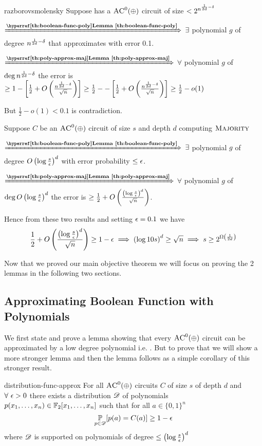 \begin{proof-of-theorem}{razborovsmolensky}
	Suppose  has a $\textsc{AC}^0(\oplus)$ circuit of size $<2^{n^{\frac1{2d}-\delta}}$\parinf
	
	$\xRightarrow{\textbf{\lmref{boolean-func-poly}}}$ $\exists$ polynomial $g$ of degree $n^{\frac1{2d}-\delta}$ that approximates  with error 0.1.
	
	
	$\xRightarrow{\textbf{\lmref{poly-approx-maj}}}$ $\forall$ polynomial $g$ of $\deg n^{\frac1{2d}-\delta}$ the error is $\geq 1-\left[\frac12+O\left( \frac{n^{\frac1{2d}-\delta}}{\sqrt{n}} \right)\right]\geq \frac12--\left[\frac12+O\left( \frac{n^{\frac1{2d}-\delta}}{\sqrt{n}} \right)\right]\geq  \frac12-o(1)$
	\parinn
	
	But $\frac12-o(1)<0.1$ is contradiction.
\end{proof-of-theorem}
\begin{alternate-proof}[razborovsmolensky]
	Suppose $C$ be an $\textsc{AC}^0(\oplus)$ circuit of size $s$ and depth $d$ computing $\textsc{Majority}$\parinf
	
	$\xRightarrow{\textbf{\lmref{boolean-func-poly}}}$ $\exists$ polynomial $g$ of degree $O\left(\log \frac{s}{\epsilon}\right)^d$ with error probability $\leq \epsilon$.
	
	$\xRightarrow{\textbf{\lmref{poly-approx-maj}}}$ $\forall$ polynomial $g$ of $\deg O\left(\log \frac{s}{\epsilon}\right)^d$ the error is $\geq \frac12+O\left(\frac{\left(\log \frac{s}{\epsilon}\right)^d}{\sqrt{n}}  \right)$.\parinn
	
	Hence from these two results and setting $\epsilon=0.1$ we have $$\frac12+O\left(\frac{\left(\log \frac{s}{\epsilon}\right)^d}{\sqrt{n}}  \right)\geq 1-\epsilon\implies \left(\log 10s\right)^d\geq \sqrt{n}\implies s\geq 2^{\Omega\left(\frac{1}{2d}\right)}$$
\end{alternate-proof}

Now that we proved our main objective theorem we will focus on proving the 2 lemmas in the following two sections.
\subsection{Approximating Boolean Function with Polynomials}
We first state and prove a lemma showing that every $\textsc{AC}^0(\oplus)$ circuit can be approximated by a low degree polynomial i.e. .  But to prove that we will show a more stronger lemma and then the lemma follows as a simple corollary of this stronger result.
\begin{lemma}{}{distribution-func-approx}
	For all $\textsc{AC}^0(\oplus)$ circuits $C$ of size $s$ of depth $d$ and $\forall\ \epsilon>0$ there exists a distribution ${\mathscr{D}}$ of polynomials $p(x_1,\dots, x_n)\in\mathbb{F}_2[x_1,\dots, x_n]$  such that for all $a\in\{0,1\}^n$ $$\underset{p\in{\mathscr{D}}}{\mathbb{P}}[p(a)=C(a)]\geq 1-\epsilon$$ where ${\mathscr{D}}$ is supported on polynomials of degree $\leq \left(\log \frac{s}{\epsilon}\right)^d$
\end{lemma}

